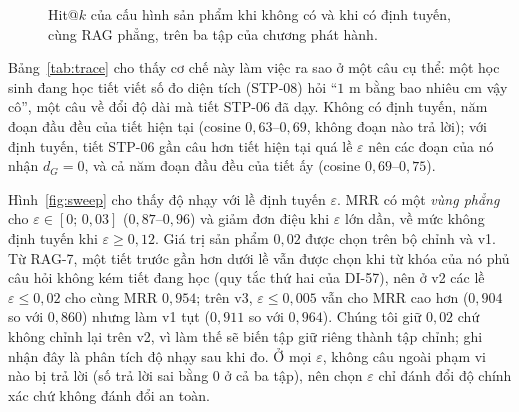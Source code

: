 \begin{table}[tp]
\centering
\caption{Tác dụng của định tuyến chủ đề (DI-57) trên cấu hình sản phẩm (lai $+$ xếp hạng lại). Mũi tên: số câu chuyển từ sai sang đúng ($\uparrow$) và ngược lại ($\downarrow$) ở Hit@3.}
\label{tab:routing}

\end{table}

\begin{figure}[tp]
\centering

\caption{Hit@$k$ của cấu hình sản phẩm khi không có và khi có định tuyến, cùng RAG phẳng, trên ba tập của chương phát hành.}
\label{fig:hitk}
\end{figure}

Bảng~\ref{tab:trace} cho thấy cơ chế này làm việc ra sao ở một câu cụ thể: một học sinh đang học tiết viết số đo diện tích (STP-08) hỏi ``$1$ m bằng bao nhiêu cm vậy cô'', một câu về đổi độ dài mà tiết STP-06 đã dạy. Không có định tuyến, năm đoạn đầu đều của tiết hiện tại (cosine $0{,}63$--$0{,}69$, không đoạn nào trả lời); với định tuyến, tiết STP-06 gần câu hơn tiết hiện tại quá lề $\varepsilon$ nên các đoạn của nó nhận $d_G=0$, và cả năm đoạn đầu đều của tiết ấy (cosine $0{,}69$--$0{,}75$).

\begin{table}[tp]
\centering
\caption{Vết truy xuất của câu ``$1$ m bằng bao nhiêu cm vậy cô'' hỏi ở tiết STP-08 (đáp án nằm ở tiết STP-06): năm đoạn đầu và các tín hiệu của chúng, không định tuyến và có định tuyến. BM25, cos: hạng của đoạn trong từng danh sách; cosine: độ gần với câu hỏi; $d_G$: khoảng cách trên đồ thị; fuse: điểm RRF nhân $1/(1+d_G)$ (nhân 100); điểm: sau xếp hạng lại (nhân 100). \tick: đoạn thuộc tiết mà nhãn ghi.}
\label{tab:trace}

\end{table}

Hình~\ref{fig:sweep} cho thấy độ nhạy với lề định tuyến $\varepsilon$. MRR có một \emph{vùng phẳng} cho $\varepsilon\in[0;\,0{,}03]$ ($0{,}87$--$0{,}96$) và giảm đơn điệu khi $\varepsilon$ lớn dần, về mức không định tuyến khi $\varepsilon\ge0{,}12$. Giá trị sản phẩm $0{,}02$ được chọn trên bộ chỉnh và v1. Từ RAG-7, một tiết trước gần hơn dưới lề vẫn được chọn khi từ khóa của nó phủ câu hỏi không kém tiết đang học (quy tắc thứ hai của DI-57), nên ở v2 các lề $\varepsilon\le0{,}02$ cho cùng MRR $0{,}954$; trên v3, $\varepsilon\le0{,}005$ vẫn cho MRR cao hơn ($0{,}904$ so với $0{,}860$) nhưng làm v1 tụt ($0{,}911$ so với $0{,}964$). Chúng tôi giữ $0{,}02$ chứ không chỉnh lại trên v2, vì làm thế sẽ biến tập giữ riêng thành tập chỉnh; ghi nhận đây là phân tích độ nhạy sau khi đo. Ở mọi $\varepsilon$, không câu ngoài phạm vi nào bị trả lời (số trả lời sai bằng $0$ ở cả ba tập), nên chọn $\varepsilon$ chỉ đánh đổi độ chính xác chứ không đánh đổi an toàn.

